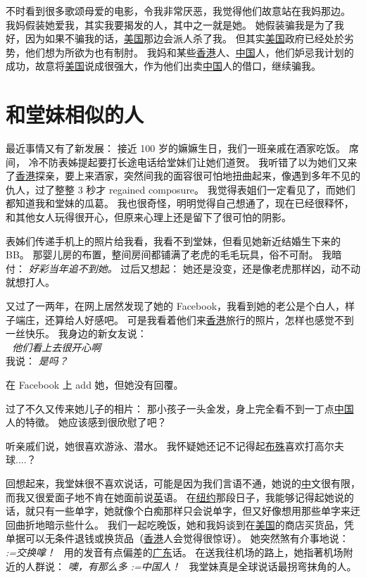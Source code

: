 \documentclass[12pt]{report}
\makeatletter
\newcommand{\tab}{\hspace*{1cm}}
\newcommand{\speechCn}[1]{\textrm{\textit{\textcolor{Speech}{#1}}}}
\renewcommand{\d}[1]{$\underaccent{\scalebox{0.5}{\textbullet}}{\textrm{#1}}$}
\newcommand{\ds}[1]{%
  \@tfor\next:=#1\do{\d{\next}}}
\newcommand*\dashh{\,\,\textemdash\kern-1pt\textemdash\,\,}
\makeatother
\begin{document}
{不时看到很多歌颂母爱的电影，令我非常厌恶，我觉得他们故意站在我妈那边。 我妈假装她爱我，其实我要揭发的人，其中之一就是她。  她假装骗我是为了我好，因为如果不骗我的话，\uline{美国}那边会派人杀了我。 但其实\uline{美国}政府已经处於劣势，他们想为所欲为也有制肘。 我妈和某些\uline{香港}人、\uline{中国}人，他们妒忌我计划的成功，故意将\uline{美国}说成很强大，作为他们出卖\uline{中国}人的借口，继续骗我。

\chapter{和堂妹相似的人}

最近事情又有了新发展：  接近 100 岁的嫲嫲生日，我们一班亲戚在酒家吃饭。  席间， 冷不防表姊提起要打长途电话给堂妹们让她们道贺。  我听错了以为她们又来了\uline{香港}探亲，要上来酒家，突然间我的面容很可怕地扭曲起来，像遇到多年不见的仇人，过了整整 3 秒才 regained composure。 我觉得表姐们一定看见了，而她们都知道我和堂妹的瓜葛。  我也很奇怪，明明觉得自己想通了，现在已经很释怀，和其他女人玩得很开心，但原来心理上还是留下了很可怕的阴影。

表姊们传递手机上的照片给我看，我看不到堂妹，但看见她新近结婚生下来的BB。 那婴儿房的布置，整间房间都铺满了老虎的毛毛玩具，俗不可耐。 我暗付： \speechCn{好彩当年追不到她。}  过后又想起： 她还是没变，还是像老虎那样凶，动不动就想打人。

又过了一两年，在网上居然发现了她的 Facebook，我看到她的老公是个白人，样子端庄，还算给人好感吧。 可是我看着他们来\uline{香港}旅行的照片，怎样也感觉不到一丝快乐。 我身边的新女友说：\\
\tab \dashh \speechCn{他们看上去很开心啊} \\
\tab 我说： \speechCn{是吗？}

在 Facebook 上 add 她，但她没有回覆。

过了不久又传来她儿子的相片： 那小孩子一头金发，身上完全看不到一丁点\uline{中国}人的特徵。 她应该感到很欣慰了吧？

听亲戚们说，她很喜欢游泳、潜水。  我怀疑她还记不记得起\uline{布殊}喜欢打高尔夫球....？

回想起来，我堂妹很不喜欢说话，可能是因为我们言语不通，她说的\uline{中}文很有限，而我又很爱面子地不肯在她面前说\uline{英}语。 在\uline{纽约}那段日子，我能够记得起她说的话，就只有一些单字，她就像个白痴那样只会说单字，但又好像想用那些单字来迂回曲折地暗示些什么。 我们一起吃晚饭，她和我妈谈到在\uline{美国}的商店买货品，凭单据可以无条件退钱或换货品（\uline{香港}人会觉得很惊讶）。 她突然煞有介事地说：\speechCn{\ds{交换}嗱！} \ 用的发音有点偏差的\uline{广东}话。 在送我往机场的路上，她指著机场附近的人群说： \speechCn{噢，有那么多\ds{中国人}！} \  我堂妹真是全球说话最拐弯抹角的人。

}
\end{document}
